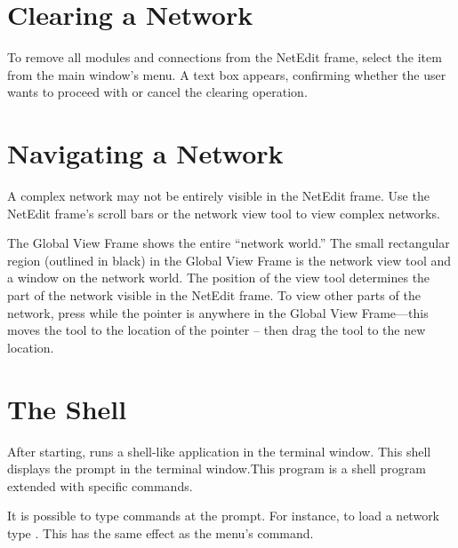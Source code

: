 \section{Clearing a Network}
\label{sec:clearnetwork}

To remove all modules and connections from the 
NetEdit frame, select the  item from the main window's
 menu.  A text box appears, confirming whether the
user wants to proceed with or cancel the clearing operation.

\section{Navigating a Network}
\label{sec:navnetwork}

A complex network may not be entirely visible in the NetEdit frame.
Use the NetEdit frame's scroll bars or the network view tool to view
complex networks.

The Global View Frame shows the 
entire ``network world.''  The small
rectangular region (outlined in black) in the Global View Frame is the
network view tool and a window on the network world. The position of
the view tool determines the part of the network visible in the
NetEdit frame.  To view other parts of the network, press
 while the pointer is anywhere in the Global View
Frame---this moves the tool to the location of the pointer -- then
drag the tool to the new location.


\section{The \sr{} Shell}
\label{sec:termapp}

After starting, \sr{} runs a shell-like application in the terminal
window. This shell displays the prompt
 in the terminal window.This program is a
 shell program extended with
\sr{} specific commands.

It is possible to type \tcl{} \sr{} commands at the prompt.  For
instance, to load a network type .  This has the same effect as the 
menu's  command.
